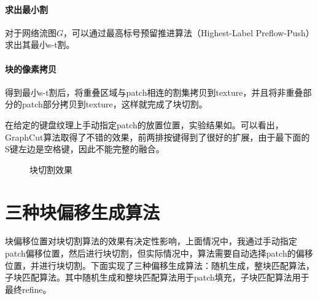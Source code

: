 \documentclass[11pt,a4paper]{article}
\begin{document}
\paragraph{求出最小割} 对于网络流图$G$，可以通过最高标号预留推进算法（Highest-Label Preflow-Push）\cite{cheriyan1989analysis}求出其最小s-t割。

\paragraph{块的像素拷贝} 得到最小s-t割后，将重叠区域与patch相连的割集拷贝到texture，并且将非重叠部分的patch部分拷贝到texture，这样就完成了块切割。

在给定的键盘纹理上手动指定patch的放置位置，实验结果如。可以看出，GraphCut算法取得了不错的效果，前两排按键得到了很好的扩展，由于最下面的S键左边是空格键，因此不能完整的融合。

\begin{figure}[H]
    \centering
    \caption{块切割效果}
    \label{fig:blockcut}
\end{figure}

\section{三种块偏移生成算法}

块偏移位置对块切割算法的效果有决定性影响，上面情况中，我通过手动指定patch偏移位置，然后进行块切割，但实际情况中，算法需要自动选择patch的偏移位置，并进行块切割。下面实现了三种偏移生成算法：随机生成，整块匹配算法，子块匹配算法。其中随机生成和整块匹配算法用于patch填充，子块匹配算法用于最终refine。
\end{document}
